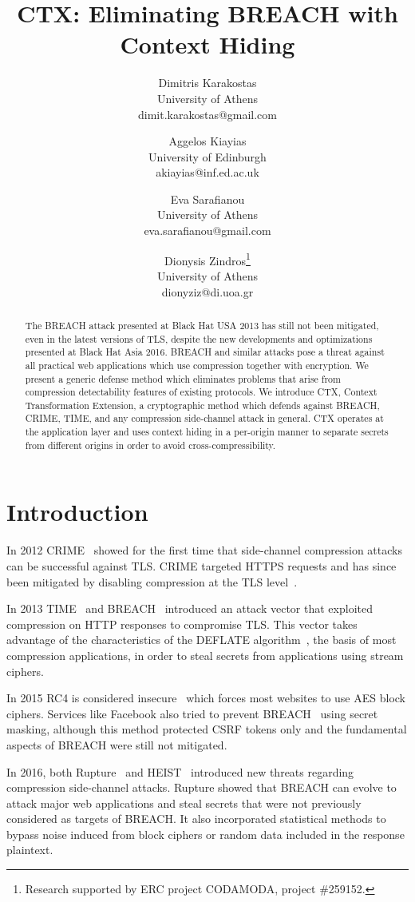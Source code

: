 \documentclass[a4paper, 11 pt, conference]{article}  %
\title{\textbf{CTX: Eliminating BREACH with Context Hiding}}
\author{
    Dimitris Karakostas\footnotemark[1]\\
    University of Athens\\
    dimit.karakostas@gmail.com\\
    \and
    Aggelos Kiayias\footnotemark[1]\\
    University of Edinburgh\\
    akiayias@inf.ed.ac.uk\\
    \and
    Eva Sarafianou\footnotemark[1]\\
    University of Athens\\
    eva.sarafianou@gmail.com\\
    \and
    Dionysis Zindros\thanks{Research supported by ERC project CODAMODA, project \#259152.}\\
    University of Athens\\
    dionyziz@di.uoa.gr\\
}
\date{}
\begin{document}
\maketitle
\thispagestyle{plain}
\pagestyle{plain}

\begin{abstract}

The BREACH attack presented at Black Hat USA 2013 has still not been mitigated,
even in the latest versions of TLS, despite the new developments and
optimizations presented at Black Hat Asia 2016. BREACH and similar attacks pose
a threat against all practical web applications which use compression together
with encryption. We present a generic defense method which eliminates problems
that arise from compression detectability features of existing protocols. We
introduce CTX, Context Transformation Extension, a cryptographic method which
defends against BREACH, CRIME, TIME, and any compression side-channel attack in
general. CTX operates at the application layer and uses context hiding in a
per-origin manner to separate secrets from different origins in order to avoid
cross-compressibility.

\end{abstract}

\section{Introduction}
In 2012 CRIME~\cite{c1} showed for the first time that side-channel compression
attacks can be successful against TLS. CRIME targeted HTTPS requests and has
since been mitigated by disabling compression at the TLS level~\cite{c2}.

In 2013 TIME~\cite{c3} and BREACH~\cite{c4} introduced an attack vector that exploited
compression on HTTP responses to compromise TLS. This vector takes advantage of the
characteristics of the DEFLATE algorithm~\cite{c5}, the basis of most
compression applications, in order to steal secrets from applications using
stream ciphers.

In 2015 RC4 is considered insecure~\cite{c6} which forces most websites to use
AES block ciphers. Services like Facebook also tried to prevent BREACH~\cite{c7}
using secret masking, although this method protected CSRF tokens only and the
fundamental aspects of BREACH were still not mitigated.

In 2016, both Rupture~\cite{c8} and HEIST~\cite{c9} introduced new threats
regarding compression side-channel attacks. Rupture showed that BREACH can
evolve to attack major web applications and steal secrets that were not
previously considered as targets of BREACH. It also incorporated statistical
methods to bypass noise induced from block ciphers or random data included in the response plaintext.
\end{document}
